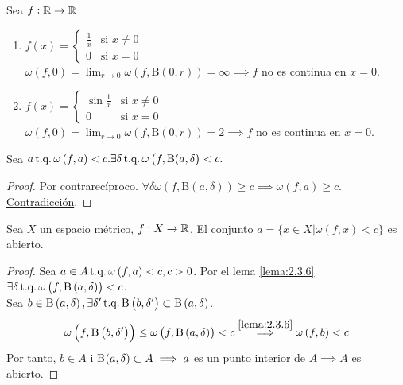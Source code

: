 \begin{example*}
    Sea $f: \mathbb{R} \to \mathbb{R}$
    \begin{enumerate}
        \item $f(x) = \begin{cases}
            \frac{1}{x} & \text{si } x \neq 0 \\
            0 & \text{si } x = 0
            \end{cases}$ \\
            $\omega \left( f, 0 \right) = \lim_{r \to 0} \omega \left( f, \text{B} \left( 0, r \right) \right) = \infty \implies f$ no es continua en $x = 0$.
        \item $f(x) = \begin{cases}
            \sin \frac{1}{x} & \text{si } x \neq 0 \\
            0 & \text{si } x = 0
            \end{cases}$ \\
            $\omega \left( f, 0 \right) = \lim_{r \to 0} \omega \left( f, \text{B} \left( 0, r \right) \right) = 2 \implies f$ no es continua en $x = 0$.
    \end{enumerate}
\end{example*}
\begin{lema} \label{lema:2.3.6}
    Sea $a \operatorname{\text{t.q.}} \omega \left( f, a \right) < c. \exists \delta \operatorname{\text{t.q.}} \omega \left( f, \text{B}(a, \delta \right) < c.$
\end{lema}
\begin{proof}
    Por contrarecíproco. $\forall \delta \omega \left( f, \text{B} \left( a, \delta \right) \right) \geq c \implies \omega \left( f, a \right) \geq c$. \underline{Contradicción}.
\end{proof}
\begin{prop}
    Sea $X$ un espacio métrico, $f : X \to \mathbb{R}$. El conjunto $a = \{ x \in X | \omega \left( f, x \right) < c \}$ es abierto.
\end{prop}
\begin{proof}
    Sea $a \in A \operatorname{\text{t.q.}} \omega \left( f, a \right) < c, c > 0$. Por el lema \ref{lema:2.3.6} $\exists \delta \operatorname{\text{t.q.}} \omega \left( f, \text{B} \left( a, \delta \right) \right) < c$. \\
    Sea $b \in \text{B} \left( a, \delta \right), \exists \delta' \operatorname{\text{t.q.}} \text{B} \left( b, \delta' \right) \subset \text{B} \left( a, \delta \right)$.
    \[
    \omega \left( f, \text{B} \left( b, \delta' \right) \right) \leq \omega \left( f, \text{B} \left( a, \delta \right) \right) < c \stackrel{\ref{lema:2.3.6}}{\implies} \omega \left( f, b \right) < c
    \]
    Por tanto, $b \in A$ i B$\left( a, \delta \right) \subset A \implies a$ es un punto interior de $A \implies A$ es abierto.
\end{proof}
